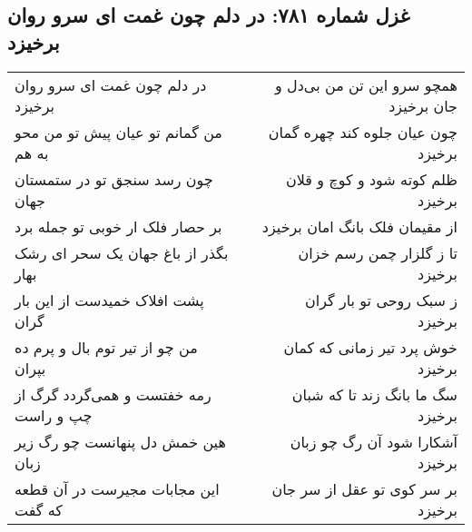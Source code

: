 \begin{center}
\section*{غزل شماره ۷۸۱: در دلم چون غمت ای سرو روان برخیزد}
\label{sec:0781}
\begin{longtable}{l p{0.5cm} r}
در دلم چون غمت ای سرو روان برخیزد
&&
همچو سرو این تن من بی‌دل و جان برخیزد
\\
من گمانم تو عیان پیش تو من محو به هم
&&
چون عیان جلوه کند چهره گمان برخیزد
\\
چون رسد سنجق تو در ستمستان جهان
&&
ظلم کوته شود و کوچ و قلان برخیزد
\\
بر حصار فلک ار خوبی تو جمله برد
&&
از مقیمان فلک بانگ امان برخیزد
\\
بگذر از باغ جهان یک سحر ای رشک بهار
&&
تا ز گلزار چمن رسم خزان برخیزد
\\
پشت افلاک خمیدست از این بار گران
&&
ز سبک روحی تو بار گران برخیزد
\\
من چو از تیر توم بال و پرم ده بپران
&&
خوش پرد تیر زمانی که کمان برخیزد
\\
رمه خفتست و همی‌گردد گرگ از چپ و راست
&&
سگ ما بانگ زند تا که شبان برخیزد
\\
هین خمش دل پنهانست چو رگ زیر زبان
&&
آشکارا شود آن رگ چو زبان برخیزد
\\
این مجابات مجیرست در آن قطعه که گفت
&&
بر سر کوی تو عقل از سر جان برخیزد
\\
\end{longtable}
\end{center}
